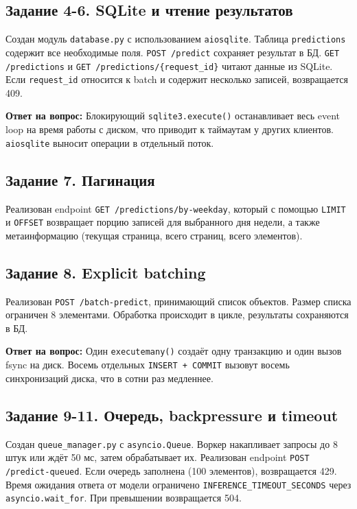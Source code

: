\documentclass[12pt,a4paper]{article}
\begin{document}
\subsection{Задание 4-6. SQLite и чтение результатов}
Создан модуль \texttt{database.py} с использованием \texttt{aiosqlite}. Таблица \texttt{predictions} содержит все необходимые поля. \texttt{POST /predict} сохраняет результат в БД. \texttt{GET /predictions} и \texttt{GET /predictions/\{request\_id\}} читают данные из SQLite. Если \texttt{request\_id} относится к batch и содержит несколько записей, возвращается 409.

\textbf{Ответ на вопрос:} Блокирующий \texttt{sqlite3.execute()} останавливает весь event loop на время работы с диском, что приводит к таймаутам у других клиентов. \texttt{aiosqlite} выносит операции в отдельный поток.

\subsection{Задание 7. Пагинация}
Реализован endpoint \texttt{GET /predictions/by-weekday}, который с помощью \texttt{LIMIT} и \texttt{OFFSET} возвращает порцию записей для выбранного дня недели, а также метаинформацию (текущая страница, всего страниц, всего элементов).

\subsection{Задание 8. Explicit batching}
Реализован \texttt{POST /batch-predict}, принимающий список объектов. Размер списка ограничен 8 элементами. Обработка происходит в цикле, результаты сохраняются в БД.

\textbf{Ответ на вопрос:} Один \texttt{executemany()} создаёт одну транзакцию и один вызов fsync на диск. Восемь отдельных \texttt{INSERT + COMMIT} вызовут восемь синхронизаций диска, что в сотни раз медленнее.

\subsection{Задание 9-11. Очередь, backpressure и timeout}
Создан \texttt{queue\_manager.py} с \texttt{asyncio.Queue}. Воркер накапливает запросы до 8 штук или ждёт 50 мс, затем обрабатывает их. Реализован endpoint \texttt{POST /predict-queued}. Если очередь заполнена (100 элементов), возвращается 429. Время ожидания ответа от модели ограничено \texttt{INFERENCE\_TIMEOUT\_SECONDS} через \texttt{asyncio.wait\_for}. При превышении возвращается 504.
\end{document}
